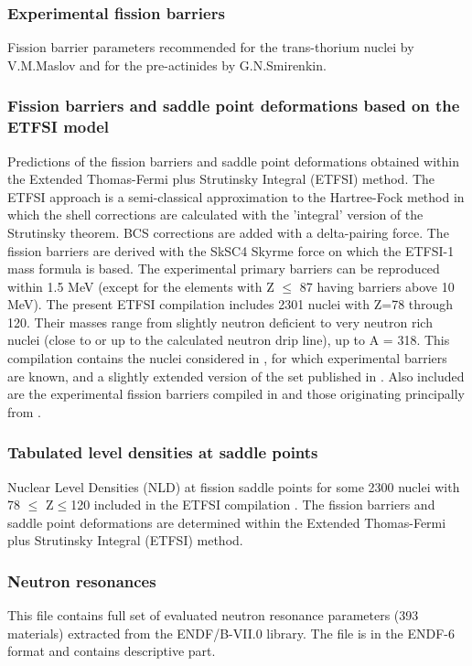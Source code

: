 \documentclass[twocolumn,amsmath,amssymb,10pt,groupedaddress,a4paper]{revtex4}
\begin{document}
\subsubsection{Experimental fission barriers}
Fission barrier parameters recommended for the trans-thorium nuclei
by V.M.Maslov and for the pre-actinides by G.N.Smirenkin.

\subsubsection{Fission barriers and saddle point deformations based on the ETFSI model}
Predictions of the fission barriers and saddle point deformations
obtained within the Extended Thomas-Fermi plus Strutinsky Integral
(ETFSI) method. The ETFSI approach is a semi-classical approximation
to the Hartree-Fock method in which the shell corrections are calculated
with the 'integral' version of the Strutinsky theorem. BCS corrections
are added with a delta-pairing force. The fission barriers are derived
with the SkSC4 Skyrme force on which the ETFSI-1 mass formula is based.
The experimental primary barriers can be reproduced within 1.5 MeV
(except for the elements with Z $\le$ 87 having barriers above 10 MeV).
The present ETFSI compilation includes 2301 nuclei with Z=78 through
120. Their masses range from slightly neutron deficient to very neutron
rich nuclei (close to or up to the calculated neutron drip line),
up to A = 318. This compilation contains the nuclei considered in
\cite{Mamdouh1998}, for which experimental barriers are known, and
a slightly extended version of the set published in \cite{Mamdouh(2001)}.
Also included are the experimental fission barriers compiled in \cite{Mamdouh1998}
and those originating principally from \cite{Smirenkin1993}.


\subsubsection{Tabulated level densities at saddle points}
Nuclear Level Densities (NLD) at fission saddle points for some 2300
nuclei with 78 $\le$ Z$\le$120 included in the ETFSI compilation
\cite{Mamdouh(2001)}. The fission barriers and saddle point deformations
are determined within the Extended Thomas-Fermi plus Strutinsky Integral
(ETFSI) method.

\subsubsection{Neutron resonances}
This file contains full set of evaluated neutron resonance parameters
(393 materials) extracted from the ENDF/B-VII.0 library. The file is
in the ENDF-6 format and contains descriptive part.
\end{document}
